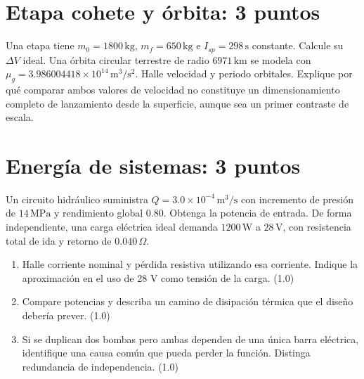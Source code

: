 \section{Etapa cohete y órbita: 3 puntos}
Una etapa tiene $m_0=1800\,\mathrm{kg}$, $m_f=650\,\mathrm{kg}$ e $I_{sp}=298\,\mathrm s$ constante. Calcule su $\Delta V$ ideal. Una órbita circular terrestre de radio $6971\,\mathrm{km}$ se modela con $\mu_g=3.986004418\times10^{14}\,\mathrm{m^3/s^2}$. Halle velocidad y periodo orbitales. Explique por qué comparar ambos valores de velocidad no constituye un dimensionamiento completo de lanzamiento desde la superficie, aunque sea un primer contraste de escala.
\section{Energía de sistemas: 3 puntos}
Un circuito hidráulico suministra $Q=3.0\times10^{-4}\,\mathrm{m^3/s}$ con incremento de presión de $14\,\mathrm{MPa}$ y rendimiento global $0.80$. Obtenga la potencia de entrada. De forma independiente, una carga eléctrica ideal demanda $1200\,\mathrm W$ a $28\,\mathrm V$, con resistencia total de ida y retorno de $0.040\,\Omega$.
\begin{enumerate}[label=\alph*)]
\item Halle corriente nominal y pérdida resistiva utilizando esa corriente. Indique la aproximación en el uso de 28 V como tensión de la carga. (1.0)
\item Compare potencias y describa un camino de disipación térmica que el diseño debería prever. (1.0)
\item Si se duplican dos bombas pero ambas dependen de una única barra eléctrica, identifique una causa común que pueda perder la función. Distinga redundancia de independencia. (1.0)
\end{enumerate}


